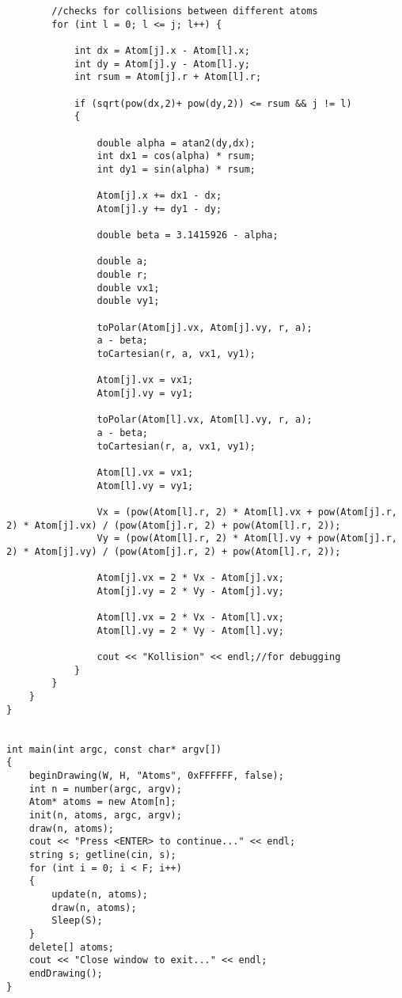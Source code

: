 \documentclass[11pt]{article}
\begin{document}
\begin{lstlisting}
		//checks for collisions between different atoms
		for (int l = 0; l <= j; l++) {
			
			int dx = Atom[j].x - Atom[l].x;
			int dy = Atom[j].y - Atom[l].y;
			int rsum = Atom[j].r + Atom[l].r;
			
			if (sqrt(pow(dx,2)+ pow(dy,2)) <= rsum && j != l)
			{
				
				double alpha = atan2(dy,dx);
				int dx1 = cos(alpha) * rsum;
				int dy1 = sin(alpha) * rsum;
				
				Atom[j].x += dx1 - dx;
				Atom[j].y += dy1 - dy;
				
				double beta = 3.1415926 - alpha;
				
				double a;
				double r;
				double vx1;
				double vy1;
				
				toPolar(Atom[j].vx, Atom[j].vy, r, a);
				a - beta;
				toCartesian(r, a, vx1, vy1);
				
				Atom[j].vx = vx1;
				Atom[j].vy = vy1;
				
				toPolar(Atom[l].vx, Atom[l].vy, r, a);
				a - beta;
				toCartesian(r, a, vx1, vy1);
				
				Atom[l].vx = vx1;
				Atom[l].vy = vy1;
				
				Vx = (pow(Atom[l].r, 2) * Atom[l].vx + pow(Atom[j].r, 2) * Atom[j].vx) / (pow(Atom[j].r, 2) + pow(Atom[l].r, 2));
				Vy = (pow(Atom[l].r, 2) * Atom[l].vy + pow(Atom[j].r, 2) * Atom[j].vy) / (pow(Atom[j].r, 2) + pow(Atom[l].r, 2));
				
				Atom[j].vx = 2 * Vx - Atom[j].vx;
				Atom[j].vy = 2 * Vy - Atom[j].vy;
				
				Atom[l].vx = 2 * Vx - Atom[l].vx;
				Atom[l].vy = 2 * Vy - Atom[l].vy;
				
				cout << "Kollision" << endl;//for debugging
			}
		}
	}
}


int main(int argc, const char* argv[])
{
	beginDrawing(W, H, "Atoms", 0xFFFFFF, false);
	int n = number(argc, argv);
	Atom* atoms = new Atom[n];
	init(n, atoms, argc, argv);
	draw(n, atoms);
	cout << "Press <ENTER> to continue..." << endl;
	string s; getline(cin, s);
	for (int i = 0; i < F; i++)
	{
		update(n, atoms);
		draw(n, atoms);
		Sleep(S);
	}
	delete[] atoms;
	cout << "Close window to exit..." << endl;
	endDrawing();
}
		\end{lstlisting}
	
	
	
	
	
	
	
	
	
	
	
\end{document}
